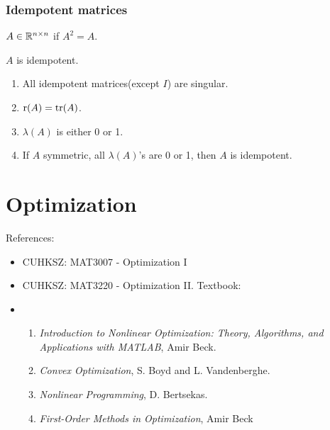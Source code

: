 \documentclass[10pt,a4paper]{book}
\begin{document}
\subsection{Idempotent matrices}\label{sec:idempotent}
\begin{defbox}
	\begin{definition}\label{def:idempotent}
		$A\in\mathbb R^{n\times n}$ if $A^2=A$.  
	\end{definition}
\end{defbox}

\begin{thmbox}
	\begin{theorem}\label{thm:idempotent}
		$A$ is idempotent.  
		\begin{enumerate}
			\item All idempotent matrices(except $I$) are singular.
			\item $\mathrm{r}(A)=\mathrm{tr}(A)$. 
			\item $\lambda(A)$ is either 0 or 1. 
			\item If $A$ symmetric, all $\lambda(A)$'s are 0 or 1, then $A$ is idempotent. 
		\end{enumerate}
	\end{theorem}
\end{thmbox}

\chapter{Optimization}\label{chap:opt}

References: 
\begin{itemize}
	\item CUHKSZ: MAT3007 - Optimization I
	\item CUHKSZ: MAT3220 - Optimization II. Textbook: 
	\item \begin{enumerate}
		\item \textit{Introduction to Nonlinear Optimization: Theory, Algorithms, and
		Applications with MATLAB}, Amir Beck.
		\item \textit{Convex Optimization}, S. Boyd and L. Vandenberghe.
		\item \textit{Nonlinear Programming}, D. Bertsekas.
		\item \textit{First-Order Methods in Optimization}, Amir Beck
	\end{enumerate}
\end{itemize}
\end{document}
